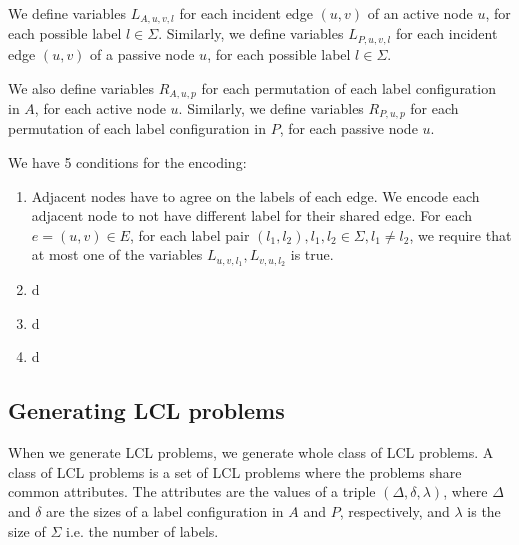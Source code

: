 We define variables $L_{A,u,v,l}$ for each incident edge $(u, v)$ of an active node $u$, for each possible label $l \in \Sigma$.
Similarly, we define variables $L_{P,u,v,l}$ for each incident edge $(u, v)$ of a passive node $u$, for each possible label $l \in \Sigma$.


We also define variables $R_{A, u, p}$ for each permutation of each label configuration in $A$, for each active node $u$.
Similarly, we define variables $R_{P, u, p}$ for each permutation of each label configuration in $P$, for each passive node $u$.

We have 5 conditions for the encoding:
\begin{enumerate}[label=(\alph*)]
\item Adjacent nodes have to agree on the labels of each edge. 
      We encode each adjacent node to not have different label for their shared edge.
      For each $e=(u, v)\in E$, for each label pair $(l_1, l_2), l_1, l_2 \in \Sigma, l_1 \neq l_2$, we require that at most one of the variables $L_{u,v,l_1}, L_{v,u,l_2}$ is true. 
\item d
\item d
\item d
\end{enumerate}

\todo{}
  \todo{}
  \todo{}
    \todo{}
    \todo{}



\subsection{Generating LCL problems} \label{sec:implementation:generating_lcl_problems}

When we generate LCL problems, we generate whole class of LCL problems.
A class of LCL problems is a set of LCL problems where the problems share common attributes.
The attributes are the values of a triple $(\Delta, \delta, \lambda)$, where $\Delta$ and $\delta$ are the sizes of a label configuration in $A$ and $P$, respectively, and $\lambda$ is the size of $\Sigma$ i.e. the number of labels.

